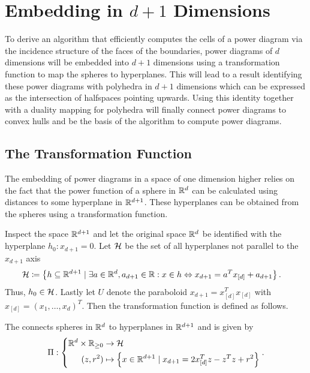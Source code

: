 \section{Embedding in \texorpdfstring{$d+1$}{d+1} Dimensions}
\label{sec:embedding_in_d_1_dimensions}
To derive an algorithm that efficiently computes the cells of a power diagram via the incidence structure of the faces of the boundaries, power diagrams of $d$ dimensions will be embedded into $d+1$ dimensions using a transformation function to map the spheres to hyperplanes.
This will lead to a result identifying these power diagrams with polyhedra in $d+1$ dimensions which can be expressed as the intersection of halfspaces pointing upwards.
Using this identity together with a duality mapping for polyhedra will finally connect power diagrams to convex hulls and be the basis of the algorithm to compute power diagrams.

\subsection{The Transformation Function}
\label{sub:the_transform}
The embedding of power diagrams in a space of one dimension higher relies on the fact that the power function of a sphere in $\mathbb{R}^d$ can be calculated using distances to some hyperplane in $\mathbb{R}^{d+1}$.
These hyperplanes can be obtained from the spheres using a transformation function.

Inspect the space $\mathbb{R}^{d+1}$ and let the original space $\mathbb{R}^d$ be identified with the hyperplane $h_0: x_{d+1} = 0$.
Let $\mathcal{H}$ be the set of all hyperplanes not parallel to the $x_{d+1}$ axis
\begin{align}
    \mathcal{H} &\coloneqq \left\{ h \subseteq \mathbb{R}^{d+1} \mid \exists a \in \mathbb{R}^d, a_{d+1} \in \mathbb{R} : x \in h \Leftrightarrow x_{d+1} = a^Tx_{[d]} + a_{d+1} \right\}.
\end{align}
Thus, $h_0 \in \mathcal{H}$.
Lastly let $U$ denote the paraboloid $x_{d+1} = x_{[d]}^Tx_{[d]}$ with $x_{[d]} = \left( x_1, \dots, x_d \right)^T$.
Then the transformation function is defined as follows.

\begin{definition}
    The  connects spheres in $\mathbb{R}^d$ to hyperplanes in $\mathbb{R}^{d+1}$ and is given by
    \begin{align}
        \Pi: \left\{\begin{aligned}
            \mathbb{R}^{d} \times \mathbb{R}_{\geq 0} &\to \mathcal{H}\\
            (z, r^2) &\mapsto \left\{ x \in \mathbb{R}^{d+1} \mid x_{d+1} = 2x_{[d]}^Tz - z^Tz + r^2 \right\}
        \end{aligned}\right..
    \end{align}
\end{definition}

